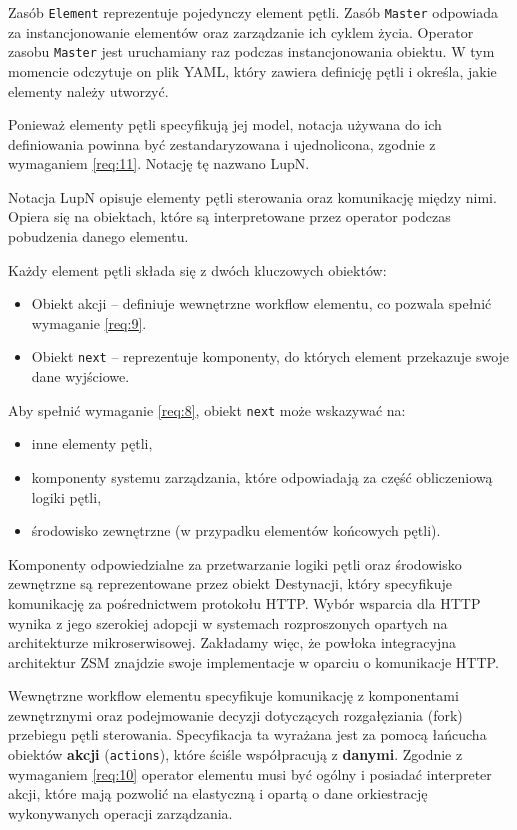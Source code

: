 Zasób \texttt{Element} reprezentuje pojedynczy element pętli.
Zasób \texttt{Master} odpowiada za instancjonowanie elementów oraz zarządzanie ich cyklem życia.
Operator zasobu \texttt{Master} jest uruchamiany raz podczas instancjonowania obiektu. W tym momencie odczytuje on plik YAML, który zawiera definicję pętli i określa, jakie elementy należy utworzyć.

Ponieważ elementy pętli specyfikują jej model, notacja używana do ich definiowania powinna być zestandaryzowana i ujednolicona, zgodnie z wymaganiem \ref{req:11}. Notację tę nazwano LupN.

Notacja LupN opisuje elementy pętli sterowania oraz komunikację między nimi. Opiera się na obiektach, które są interpretowane przez operator podczas pobudzenia danego elementu.

Każdy element pętli składa się z dwóch kluczowych obiektów:
\begin{itemize}
    \item Obiekt akcji – definiuje wewnętrzne workflow elementu, co pozwala spełnić wymaganie \ref{req:9}.
    \item Obiekt \texttt{next} – reprezentuje komponenty, do których element przekazuje swoje dane wyjściowe.
\end{itemize}

Aby spełnić wymaganie \ref{req:8}, obiekt \texttt{next} może wskazywać na:
\begin{itemize}
    \item inne elementy pętli,
    \item komponenty systemu zarządzania, które odpowiadają za część obliczeniową logiki pętli,
    \item środowisko zewnętrzne (w przypadku elementów końcowych pętli).
\end{itemize}

Komponenty odpowiedzialne za przetwarzanie logiki pętli oraz środowisko zewnętrzne są reprezentowane przez obiekt Destynacji, który specyfikuje komunikację za pośrednictwem protokołu HTTP. Wybór wsparcia dla HTTP wynika z jego szerokiej adopcji w systemach rozproszonych opartych na architekturze mikroserwisowej. Zakładamy więc, że powłoka integracyjna architektur ZSM znajdzie swoje implementacje w oparciu o komunikacje HTTP.

Wewnętrzne workflow elementu specyfikuje komunikację z komponentami zewnętrznymi oraz podejmowanie decyzji dotyczących rozgałęziania (fork) przebiegu pętli sterowania. Specyfikacja ta wyrażana jest za pomocą łańcucha obiektów \textbf{akcji} (\texttt{actions}), które ściśle współpracują z \textbf{danymi}. Zgodnie z wymaganiem \ref{req:10} operator elementu musi być ogólny i posiadać interpreter akcji, które mają pozwolić na elastyczną i opartą o dane orkiestrację wykonywanych operacji zarządzania. 

